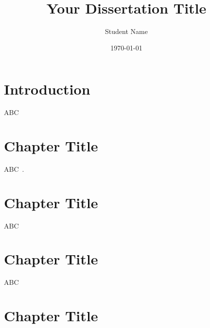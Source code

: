 \documentclass[12pt]{report}
\title{Your Dissertation Title}
\author{Student Name}
\date{\today}
\begin{document}
 

\maketitle


\setcounter{page}{2}
\makeacknowledgement
\makeabstract


{}
\tableofcontents
\clearpage 

 {}
\listoffigures 
\clearpage


\begin{mainf}







\clearpage


\chapter*{Introduction}
\setcounter{chapter}{0}

ABC

\clearpage



\chapter{Chapter Title}

ABC~\cite{ishibe2006cell}.

\clearpage



\chapter{Chapter Title}

ABC

\clearpage



\chapter{Chapter Title}

ABC

\clearpage



\chapter{Chapter Title}


\end{mainf}
\end{document}
